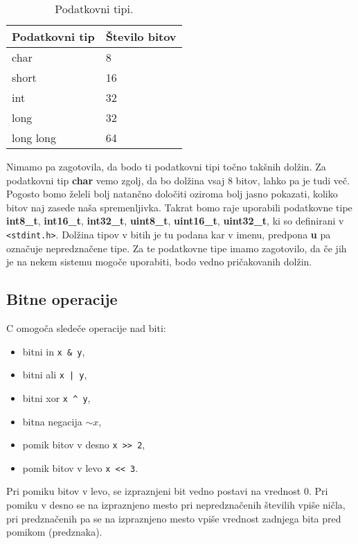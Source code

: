 \documentclass[12pt,letterpaper]{article}
\begin{document}
\begin{table}[ht!]
    \caption{Podatkovni tipi.}
    \centering
    \begin{tabular}{|l|l|}
        \hline
        Podatkovni tip & Število bitov  \\ \hline
        char           & 8              \\ \hline
        short          & 16             \\ \hline
        int            & 32             \\ \hline
        long           & 32             \\ \hline
        long long      & 64             \\ \hline
    \end{tabular}
    \label{byti}
\end{table}

Nimamo pa zagotovila, da bodo ti podatkovni tipi točno takšnih dolžin. Za podatkovni tip \textbf{char} vemo zgolj, da bo dolžina vsaj 8 bitov, lahko pa je tudi več. Pogosto bomo želeli bolj natančno določiti oziroma bolj jasno pokazati, koliko bitov naj zasede naša spremenljivka. Takrat bomo raje uporabili podatkovne tipe \textbf{int8\_t}, \textbf{int16\_t}, \textbf{int32\_t}, \textbf{uint8\_t}, \textbf{uint16\_t}, \textbf{uint32\_t}, ki so definirani v \texttt{<stdint.h>}. Dolžina tipov v bitih je tu podana kar v imenu, predpona \textbf{u} pa označuje nepredznačene tipe. Za te podatkovne tipe imamo zagotovilo, da če jih je na nekem sistemu mogoče uporabiti, bodo vedno pričakovanih dolžin.


\subsection*{Bitne operacije}
C omogoča sledeče operacije nad biti:
\begin{itemize}
    \item bitni in \texttt{x  \&  y},
    \item bitni ali \texttt{x  |  y},
    \item bitni xor \texttt{x \^{} y},
    \item bitna negacija \texttt{$\sim x$},
    \item pomik bitov v desno \texttt{x  >>  2},
    \item pomik bitov v levo \texttt{x  <<  3}.
\end{itemize}

Pri pomiku bitov v levo, se izpraznjeni bit vedno postavi na vrednost 0. Pri pomiku v desno se na izpraznjeno mesto pri nepredznačenih številih vpiše ničla, pri predznačenih pa se na izpraznjeno mesto vpiše vrednost zadnjega bita pred pomikom (predznaka).
\end{document}
